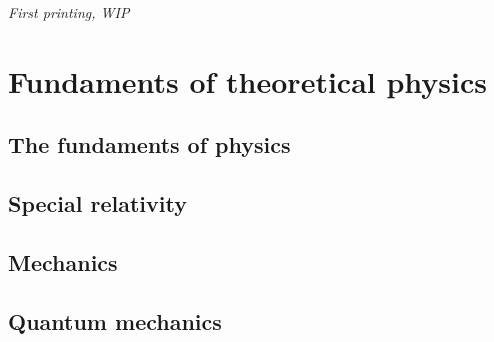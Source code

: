 \documentclass[11pt,fleqn]{book} %
\begin{document}
\noindent \textit{First printing, WIP} %




\pagestyle{empty} %

\tableofcontents %

\cleardoublepage %

\pagestyle{fancy} %




\part{Fundaments of theoretical physics}\label{part:Fund}



\chapter{The fundaments of physics}



\chapter{Special relativity}

\chapter{Mechanics}
 
\chapter{Quantum mechanics}
\end{document}
